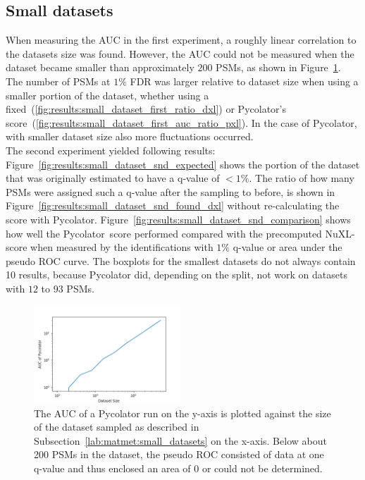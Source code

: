 \renewcommand{\baselinestretch}{1}

\subsection{Small datasets}
\label{lab:results:small_datasets}
When measuring the AUC in the first experiment, a roughly linear correlation to the datasets size was found. However, the AUC could not be measured when the dataset became smaller than approximately $200$ PSMs, as shown in Figure~\ref{fig:results:small_dataset_first_auc}. The number of PSMs at $1\%$ FDR was larger relative to dataset size when using a smaller portion of the dataset, whether using a fixed~(\ref{fig:results:small_dataset_first_ratio_dxl}) or Pycolator's score~(\ref{fig:results:small_dataset_first_auc_ratio_pxl}). In the case of Pycolator, with smaller dataset size also more fluctuations occurred.\\
The second experiment yielded following results: Figure~\ref{fig:results:small_dataset_snd_expected} shows the portion of the dataset that was originally estimated to have a q-value of $<1\%$. The ratio of how many PSMs were assigned such a q-value after the sampling to before, is shown in Figure~\ref{fig:results:small_dataset_snd_found_dxl} without re-calculating the score with Pycolator. Figure~\ref{fig:results:small_dataset_snd_comparison} shows how well the Pycolator~score performed compared with the precomputed NuXL-score when measured by the identifications with $1\%$ q-value or area under the pseudo ROC curve. The boxplots for the smallest datasets do not always contain 10 results, because Pycolator did, depending on the split, not work on datasets with $12$ to $93$ PSMs.\\
\renewcommand{\baselinestretch}{0.9}
\begin{figure}
	\normalsize
	\centering
	\includegraphics[width = 0.49\textwidth]{figures/aucs_perc.png}
	\caption[Correlation between AUC and dataset size]{The AUC of a Pycolator run on the y-axis is plotted against the size of the dataset sampled as described in Subsection~\ref{lab:matmet:small_datasets} on the x-axis. Below about 200 PSMs in the dataset, the pseudo ROC consisted of data at one q-value and thus enclosed an area of 0 or could not be determined.}
	\label{fig:results:small_dataset_first_auc}
\end{figure}
